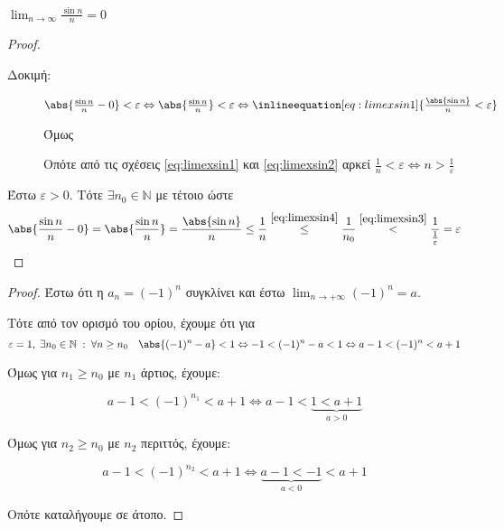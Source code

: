 \documentclass[main.tex]{subfiles}
\begin{document}
\begin{examples}
\begin{enumerate}[i)]
    \item $ \lim_{n \to \infty} \frac{\sin{n}}{n} = 0 $

      \begin{proof}
      \item {}
        \begin{description}
          \item[Δοκιμή:] $ \abs{\frac{\sin{n}}{n} - 0} < 
            \varepsilon \Leftrightarrow \abs{\frac{\sin{n}}{n}}
            < \varepsilon \Leftrightarrow 
            \inlineequation[eq:limexsin1]{\frac{\abs{\sin{n}}}
            {n} < \varepsilon} $

            Όμως

            Οπότε από τις σχέσεις \eqref{eq:limexsin1} και 
            \eqref{eq:limexsin2} αρκεί $ \frac{1}{n} < 
            \varepsilon \Leftrightarrow n > \frac{1}{
            \varepsilon} $
        \end{description}

        Έστω $ \varepsilon >0 $. Τότε $ \exists n_{0} \in \mathbb{N}
        $ με  τέτοιο ώστε
        \[
          \abs{\frac{\sin{n}}{n} - 0} =  \abs{\frac{\sin{n}}{n}} =
          \frac{\abs{\sin{n}}}{n} \leq \frac{1}{n}
          \overset{\eqref{eq:limexsin4}}{\leq}  \frac{1}{n_{0}}
          \overset{\eqref{eq:limexsin3}}{<}
          \frac{1}{\frac{1}{\varepsilon}
          } = \varepsilon 
        \] 
      \end{proof}
  \end{enumerate}
\end{examples}


\begin{proof}
\item {}
  Έστω ότι η $ a_{n}= (-1)^{n} $ συγκλίνει και έστω $ \lim_{n \to +
  \infty}(-1)^{n} = a $. 

  Τότε από τον ορισμό του ορίου, έχουμε ότι για 
  \[ 
    \varepsilon = 1, \; \exists n_{0} \in \mathbb{N} \; : \; \forall 
    n \geq n_{0} \quad \abs{(-1)^{n}-a} < 1 \Leftrightarrow -1 < 
    (-1)^{n} -a < 1 \Leftrightarrow a-1 < (-1)^{n} < a+1
  \]

  Όμως για $ n_{1} \geq n_{0} $ με $ n_{1} $ άρτιος, έχουμε:

  \[
    a-1 <  (-1)^{n_{1}} < a+1 \Leftrightarrow a-1 < 
    \underbrace{1 < a+1}_{a>0} 
  \] 

  Όμως για $ n_{2} \geq n_{0} $ με $ n_{2} $ περιττός, έχουμε:

  \[
    a-1 <  (-1)^{n_{2}} < a+1 \Leftrightarrow 
    \underbrace{a-1 < -1}_{a<0} < a+1
  \] 

  Οπότε καταλήγουμε σε άτοπο.
\end{proof}
\end{document}
